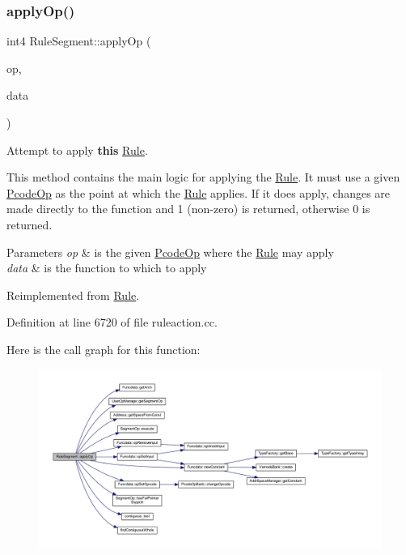 \subsubsection{\texorpdfstring{applyOp()}{applyOp()}}
{\footnotesize\ttfamily int4 Rule\+Segment\+::apply\+Op (\begin{DoxyParamCaption}\item[{\mbox{\hyperlink{class_pcode_op}{Pcode\+Op}} $\ast$}]{op,  }\item[{\mbox{\hyperlink{class_funcdata}{Funcdata}} \&}]{data }\end{DoxyParamCaption})\hspace{0.3cm}{\ttfamily [virtual]}}



Attempt to apply {\bfseries{this}} \mbox{\hyperlink{class_rule}{Rule}}. 

This method contains the main logic for applying the \mbox{\hyperlink{class_rule}{Rule}}. It must use a given \mbox{\hyperlink{class_pcode_op}{Pcode\+Op}} as the point at which the \mbox{\hyperlink{class_rule}{Rule}} applies. If it does apply, changes are made directly to the function and 1 (non-\/zero) is returned, otherwise 0 is returned. 
\begin{DoxyParams}{Parameters}
{\em op} & is the given \mbox{\hyperlink{class_pcode_op}{Pcode\+Op}} where the \mbox{\hyperlink{class_rule}{Rule}} may apply \\
\hline
{\em data} & is the function to which to apply \\
\hline
\end{DoxyParams}


Reimplemented from \mbox{\hyperlink{class_rule_a4e3e61f066670175009f60fb9dc60848}{Rule}}.



Definition at line 6720 of file ruleaction.\+cc.

Here is the call graph for this function\+:
\nopagebreak
\begin{figure}[H]
\begin{center}
\leavevmode
\includegraphics[width=350pt]{class_rule_segment_ae9c0b0fb9076088f2adf5342f8e100f6_cgraph}
\end{center}
\end{figure}
\mbox{\label{class_rule_segment_a12ddd2117c6a7ac26f4ae3b053abd363}} 
